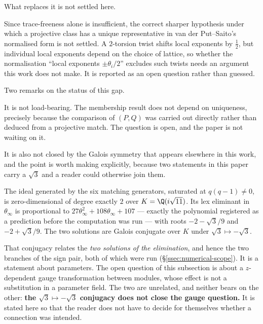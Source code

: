 What replaces it is not settled here.

\begin{remark}
Since trace-freeness alone is insufficient, the correct sharper hypothesis
under which a projective class has a unique representative in van der
Put--Saito's normalised form is not settled. A $2$-torsion twist shifts local
exponents by $\tfrac12$, but individual local exponents depend on the choice of
lattice, so whether the normalisation ``local exponents $\pm\theta_i/2$''
excludes such twists needs an argument this work does not make. It is reported
as an open question rather than guessed.
\end{remark}

Two remarks on the status of this gap.

It is not load-bearing. The membership result does not depend on uniqueness,
precisely because the comparison of $(P,Q)$ was carried out directly rather
than deduced from a projective match. The question is open, and the paper is
not waiting on it.

It is also not closed by the Galois symmetry that appears elsewhere in this
work, and the point is worth making explicitly, because two statements in this
paper carry a $\sqrt3$ and a reader could otherwise join them.

\begin{remark}
The ideal generated by the six matching generators, saturated at $q(q-1)\neq0$,
is zero-dimensional of degree exactly $2$ over $K=\Q(i\sqrt{11})$. Its lex
eliminant in $\theta_\infty$ is proportional to
$27\theta_\infty^{2}+108\theta_\infty+107$ --- exactly the polynomial
registered as a prediction before the computation was run --- with roots
$-2-\sqrt3/9$ and $-2+\sqrt3/9$. The two solutions are Galois conjugate over
$K$ under $\sqrt3\mapsto-\sqrt3$.
\end{remark}

That conjugacy relates the \emph{two solutions of the elimination}, and hence
the two branches of the sign pair, both of which were run
(\S\ref{ssec:numerical-scope}). It is a statement about parameters. The open
question of this subsection is about a $z$-dependent gauge transformation
between modules, whose effect is not a substitution in a parameter field. The
two are unrelated, and neither bears on the other: \textbf{the
$\sqrt3\mapsto-\sqrt3$ conjugacy does not close the gauge question.} It is
stated here so that the reader does not have to decide for themselves whether a
connection was intended.


